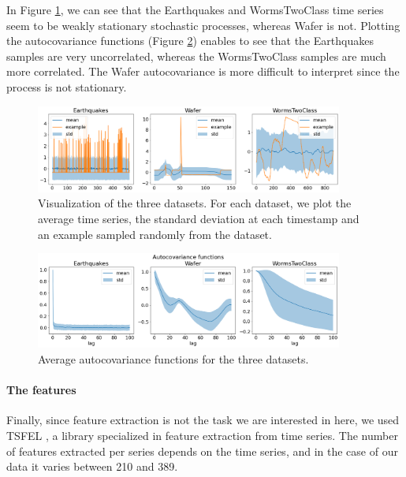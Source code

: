 \documentclass[11pt]{article}
\begin{document}
In Figure \ref{fig:ds_visulization}, we can see that the Earthquakes and WormsTwoClass time series seem to be weakly stationary stochastic processes, whereas Wafer is not. Plotting the autocovariance functions (Figure \ref{fig:ds_acov}) enables to see that the Earthquakes samples are very uncorrelated, whereas the WormsTwoClass samples are much more correlated. The Wafer autocovariance is more difficult to interpret since the process is not stationary.

\begin{figure}
    \centering
    \includegraphics[width=0.9\textwidth, keepaspectratio=True]{figures/ds_visualization.png}
    \caption{Visualization of the three datasets. For each dataset, we plot the average time series, the standard deviation at each timestamp and an example sampled randomly from the dataset.}
    \label{fig:ds_visulization}
\end{figure}


\begin{figure}
    \centering
    \includegraphics[width=0.9\textwidth, keepaspectratio=True]{figures/ds_acov.png}
    \caption{Average autocovariance functions for the three datasets.}
    \label{fig:ds_acov}
\end{figure}

\paragraph{The features} Finally, since feature extraction is not the task we are interested in here, we used TSFEL \cite{barandas_tsfel_2020}, a library specialized in feature extraction from time series. The number of features extracted per series depends on the time series, and in the case of our data it varies between 210 and 389.
\end{document}
